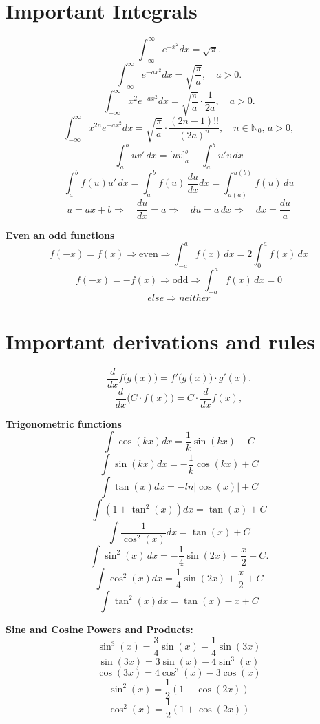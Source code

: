 \documentclass[a4paper,11pt]{article}
\renewcommand{\textbf}[1]{{\scriptsize	\bfseries #1}}
\begin{document}
\begin{footnotesize}
\begin{multicols}{2}
\begin{minipage}{\linewidth}
\section*{Important Integrals}
\[
    \int_{-\infty}^\infty e^{-x^2} dx = \sqrt{\pi}.
    \]
\[
\int_{-\infty}^\infty e^{-a x^2} dx = \sqrt{\frac{\pi}{a}}, \quad a > 0.
\]
\[
\int_{-\infty}^\infty x^2 e^{-a x^2} dx = \sqrt{\frac{\pi}{a}} \cdot \frac{1}{2a}, \quad a > 0.
\]
\[
    \int_{-\infty}^\infty x^{2n} e^{-a x^2} dx = \sqrt{\frac{\pi}{a}} \cdot \frac{(2n-1)!!}{(2a)^n}, \quad n \in \mathbb{N}_0, \, a > 0,
    \]
\[
\int_a^b u v' \, dx = \big[ u v \big]_a^b - \int_a^b u' v \, dx
\]
\[
\int_a^b f(u) u' \, dx =\int_a^b f(u) \, \frac{du}{dx} dx = \int_{u(a)}^{u(b)} f(u) \, du
\]
\[
u = ax + b \Rightarrow \quad \frac{du}{dx} = a \Rightarrow \quad du = a \, dx \Rightarrow \quad dx = \frac{du}{a} 
\]

\textbf{Even an odd functions} \\[-0.2cm]
\[
f(-x) = f(x) \Rightarrow \text{even} \Rightarrow \int_{-a}^a f(x) \, dx = 2 \int_0^a f(x) \, dx
\]
\[
f(-x) = -f(x) \Rightarrow \text{odd} \Rightarrow \int_{-a}^a f(x) \, dx = 0
\]
\[
else \Rightarrow neither
\]
\end{minipage}
\section*{Important derivations and rules}

\[
\frac{d}{dx} f\big(g(x)\big) = f'\big(g(x)\big) \cdot g'(x).
\]
\[
\frac{d}{dx}\big(C \cdot f(x)\big) = C \cdot \frac{d}{dx}f(x),
\]

\begin{minipage}{\linewidth}

\textbf{Trigonometric functions} \\[-0.2cm]
\[
\int \cos(kx) dx = \frac{1}{k}\sin(kx) + C
\]
\[
\int \sin(kx) dx = -\frac{1}{k}\cos(kx) + C
\]
\[
\int \tan(x) dx = -ln\left|\cos(x)\right| + C
\]
\[
\int (1+\tan^2(x)) dx = \tan(x) + C
\]
\[
\int \frac{1}{\cos^2(x)} dx = \tan(x) +C
\]
\[
\int \sin^2(x) \, dx = -\frac{1}{4} \sin(2x) - \frac{x}{2} + C.
\]
\[
\int \cos^2(x) dx = \frac{1}{4}\sin(2x) + \frac{x}{2}+C
\]
\[
\int \tan^2(x) dx = \tan(x) - x + C
\]



\end{minipage}
\begin{minipage}{\linewidth}
\textbf{Sine and Cosine Powers and Products:}
\[
\sin^3(x) = \frac{3}{4}\sin(x) - \frac{1}{4}\sin(3x)
\]
\[
\sin(3x) = 3\sin(x) - 4\sin^3(x)
\]
\[
\cos(3x) = 4\cos^3(x) - 3\cos(x)
\]
\[
\sin^2(x) = \frac{1}{2} (1 - \cos(2x)) 
\]
\[
\cos^2(x)  = \frac{1}{2} (1 + \cos(2x))
\]


\end{minipage}
\end{multicols}
\end{footnotesize}
\end{document}
